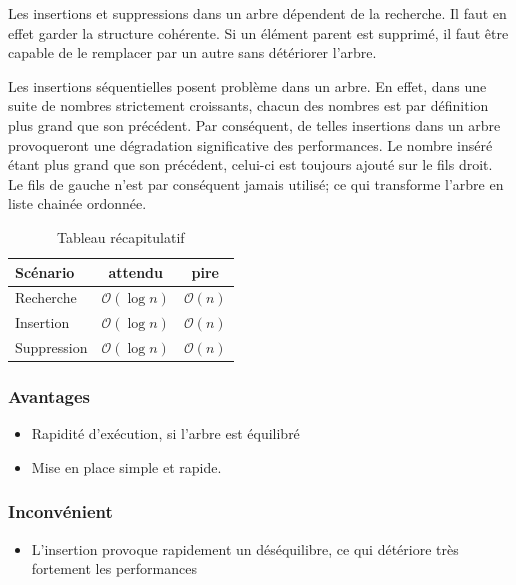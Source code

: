 \documentclass[hidelinks,a4paper, 12pt]{article}
\begin{document}
	Les insertions et suppressions dans un arbre dépendent de la recherche. Il faut en effet garder la structure cohérente. Si un élément parent est supprimé, il faut être capable de le remplacer par un autre sans détériorer l'arbre.
	
	Les insertions séquentielles posent problème dans un arbre. En effet, dans une suite de nombres strictement croissants, chacun des nombres est par définition plus grand que son précédent. Par conséquent, de telles insertions dans un arbre provoqueront une dégradation significative des performances. Le nombre inséré étant plus grand que son précédent, celui-ci est toujours ajouté sur le fils droit. Le fils de gauche n'est par conséquent jamais utilisé; ce qui transforme l'arbre en liste chainée ordonnée.
	
	 \begin{table}[h]
	 	\begin{tabular}{|l|c|c|}
	 		\hline
	 		Scénario & attendu & pire \\
	 		\hline
	 		Recherche & $\mathcal{O}(\log n)$ & $\mathcal{O}(n)$ \\ 
	 		\hline
	 		Insertion & $\mathcal{O}(\log n)$ & $\mathcal{O}(n)$ \\
	 		\hline
	 		Suppression & $\mathcal{O}(\log n)$ & $\mathcal{O}(n)$\\
	 		\hline
	 	\end{tabular}
	 	\caption{Tableau récapitulatif}
	 \end{table}
	
	\subsubsection*{Avantages}
	\begin{itemize}
		\item Rapidité d'exécution, si l'arbre est équilibré
		\item Mise en place simple et rapide.
	\end{itemize}
	\subsubsection*{Inconvénient}
	\begin{itemize}
		\item L'insertion provoque rapidement un déséquilibre, ce qui détériore très fortement les performances
	\end{itemize}
\end{document}

